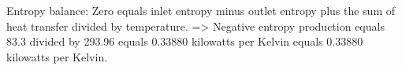 Entropy balance:  
Zero equals inlet entropy minus outlet entropy plus the sum of heat transfer divided by temperature.  
=> Negative entropy production equals 83.3 divided by 293.96 equals 0.33880 kilowatts per Kelvin equals 0.33880 kilowatts per Kelvin.